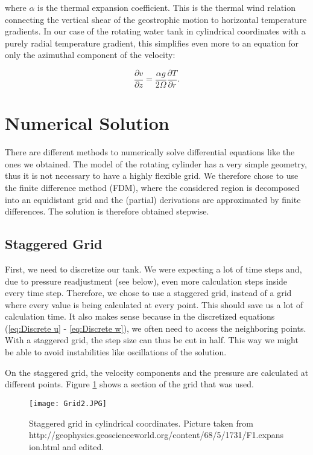 \documentclass[12pt, a4paper]{article} %
\begin{document}
		where $\alpha$ is the thermal expansion coefficient. This is the thermal wind relation connecting the vertical shear of the geostrophic motion to horizontal temperature gradients. In our case of the rotating water tank in cylindrical coordinates with a purely radial temperature gradient, this simplifies even more to an equation for only the azimuthal component of the velocity:
		
		\begin{equation}
			\frac{\partial v}{\partial z} = \frac{\alpha g}{2\Omega} \frac{\partial T}{\partial r} .
			\label{eq:Thermal Wind}
		\end{equation}
		
	\newpage		
\section{Numerical Solution}
	There are different methods to numerically solve differential equations like the ones we obtained. The model of the rotating cylinder has a very simple geometry, thus it is not necessary to have a highly flexible grid. We therefore chose to use the finite difference method (FDM), where the considered region is decomposed into an equidistant grid and the (partial) derivations are approximated by finite differences. The solution is therefore obtained stepwise. 
	
	
	\subsection{Staggered Grid} %
		First, we need to discretize our tank. We were expecting a lot of time steps and, due to pressure readjustment (see below), even more calculation steps inside every time step. Therefore, we chose to use a staggered grid, instead of a grid where every value is being calculated at every point. This should save us a lot of calculation time. It also makes sense because in the discretized equations (\ref{eq:Discrete u} - \ref{eq:Discrete w}), we often need to access the neighboring points. With a staggered grid, the step size can thus be cut in half. This way we might be able to avoid instabilities like oscillations of the solution.
		
		On the staggered grid, the velocity components and the pressure are calculated at different points. Figure \ref{fig:Grid} shows a section of the grid that was used.
		
		\begin{figure}[H]
			\centering
			\captionsetup{width=0.9\textwidth}
			\texttt{[image: Grid2.JPG]}
			\caption[Staggered grid in cylindrical coordinates]{Staggered grid in cylindrical coordinates. Picture taken from http://geophysics.geoscienceworld.org/content/68/5/1731/F1.expansion.html and edited.} %
			\label{fig:Grid}
		\end{figure}
		
\end{document}
